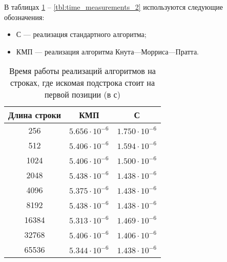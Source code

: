 В таблицах \ref{tbl:time_measurements} -- \ref{tbl:time_measurements_2} используются следующие обозначения: 
\begin{itemize}
	\item С --- реализация стандартного алгоритма;
	\item КМП --- реализация алгоритма Кнута---Морриса---Пратта.
\end{itemize}

\begin{table}[H]
	\begin{center}
		\begin{threeparttable}
			\captionsetup{justification=raggedright,singlelinecheck=off}
			\caption{Время работы реализаций алгоритмов на строках, где искомая подстрока стоит на первой позиции (в с)}
			\label{tbl:time_measurements}
			\begin{tabular}{|c|c|c|}
				\hline
				Длина строки &  КМП  & С \\
				\hline
				256 &$ 5.656\cdot 10^{-6} $&$ 1.750\cdot 10^{-6}$\\
				\hline
				512 &$ 5.406\cdot 10^{-6} $&$ 1.594\cdot 10^{-6}$\\
				\hline
				1024 &$ 5.406\cdot 10^{-6} $&$ 1.500\cdot 10^{-6}$\\
				\hline
				2048 &$ 5.438\cdot 10^{-6} $&$ 1.438\cdot 10^{-6}$\\
				\hline
				4096 &$ 5.375\cdot 10^{-6} $&$ 1.438\cdot 10^{-6}$\\
				\hline
				8192 &$ 5.438\cdot 10^{-6} $&$ 1.438\cdot 10^{-6}$\\
				\hline
				16384 &$ 5.313\cdot 10^{-6} $&$ 1.469\cdot 10^{-6}$\\
				\hline
				32768 &$ 5.406\cdot 10^{-6} $&$ 1.406\cdot 10^{-6}$\\
				\hline
				65536 &$ 5.344\cdot 10^{-6} $&$ 1.438\cdot 10^{-6}$\\
				\hline
			\end{tabular}
		\end{threeparttable}
	\end{center}
\end{table}

